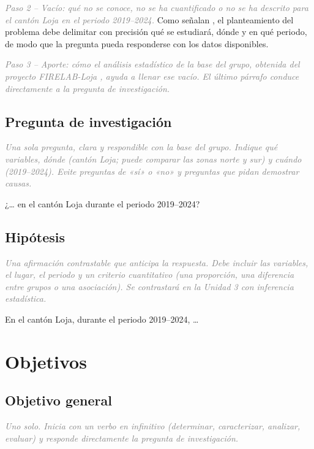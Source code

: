 \documentclass[12pt,a4paper]{article}
\newcommand{\instruccion}[1]{\textcolor{gray}{\textit{#1}}}
\begin{document}
\instruccion{Paso 2 -- Vacío: qué no se conoce, no se ha cuantificado o no se ha descrito para el cantón Loja en el periodo 2019--2024.}
Como señalan \textcite{hernandez2018}, el planteamiento del problema debe delimitar con precisión qué se estudiará, dónde y en qué periodo, de modo que la pregunta pueda responderse con los datos disponibles.

\instruccion{Paso 3 -- Aporte: cómo el análisis estadístico de la base del grupo, obtenida del proyecto FIRELAB-Loja \parencite{firelab2025}, ayuda a llenar ese vacío. El último párrafo conduce directamente a la pregunta de investigación.}

\subsection{Pregunta de investigación}

\instruccion{Una sola pregunta, clara y respondible con la base del grupo. Indique qué variables, dónde (cantón Loja; puede comparar las zonas norte y sur) y cuándo (2019--2024). Evite preguntas de «sí» o «no» y preguntas que pidan demostrar causas.}

¿\ldots{} en el cantón Loja durante el periodo 2019--2024?

\subsection{Hipótesis}

\instruccion{Una afirmación contrastable que anticipa la respuesta. Debe incluir las variables, el lugar, el periodo y un criterio cuantitativo (una proporción, una diferencia entre grupos o una asociación). Se contrastará en la Unidad 3 con inferencia estadística.}

En el cantón Loja, durante el periodo 2019--2024, \ldots{}

\section{Objetivos}

\subsection{Objetivo general}

\instruccion{Uno solo. Inicia con un verbo en infinitivo (determinar, caracterizar, analizar, evaluar) y responde directamente la pregunta de investigación.}
\end{document}
